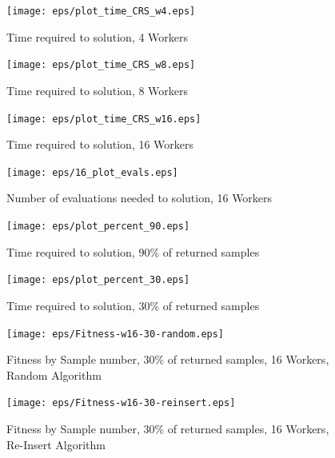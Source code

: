 \documentclass{llncs}
\begin{document}
\begin{figure}[t]
\centering
\texttt{[image: eps/plot\_time\_CRS\_w4.eps]}
\caption{Time required to solution, 4 Workers}
\label{fig:plot_time_ri_w4}
\end{figure}



\begin{figure}[!t]
\centering
\texttt{[image: eps/plot\_time\_CRS\_w8.eps]}
\caption{Time required to solution, 8 Workers}
\label{fig:plot_time_ri_w8}
\end{figure}


\begin{figure}[!t]
\centering
\texttt{[image: eps/plot\_time\_CRS\_w16.eps]}
\caption{Time required to solution, 16 Workers}
\label{fig:plot_time_ri_w16}
\end{figure}


\begin{figure}[!t]
\centering
\texttt{[image: eps/16\_plot\_evals.eps]}
\caption{Number of evaluations needed to solution, 16 Workers}
\label{fig:plot_evals_w16}
\end{figure}

\begin{figure}[!t]
\centering
\texttt{[image: eps/plot\_percent\_90.eps]}
\caption{Time required to solution, 90\% of returned samples}
\label{fig:plot_percent_90}
\end{figure}

\begin{figure}[!t]
\centering
\texttt{[image: eps/plot\_percent\_30.eps]}
\caption{Time required to solution, 30\% of returned samples}
\label{fig:plot_percent_30}
\end{figure}

\begin{figure}[!t]
\centering
\texttt{[image: eps/Fitness-w16-30-random.eps]}
\caption{Fitness by Sample number, 30\% of returned samples, 16 Workers, Random Algorithm}
\label{fig:Fitness-w16-30-random}
\end{figure}

\begin{figure}[!t]
\centering
\texttt{[image: eps/Fitness-w16-30-reinsert.eps]}
\caption{Fitness by Sample number, 30\% of returned samples, 16 Workers, Re-Insert Algorithm}
\label{fig:Fitness-w16-30-reinsert}
\end{figure}
\end{document}
